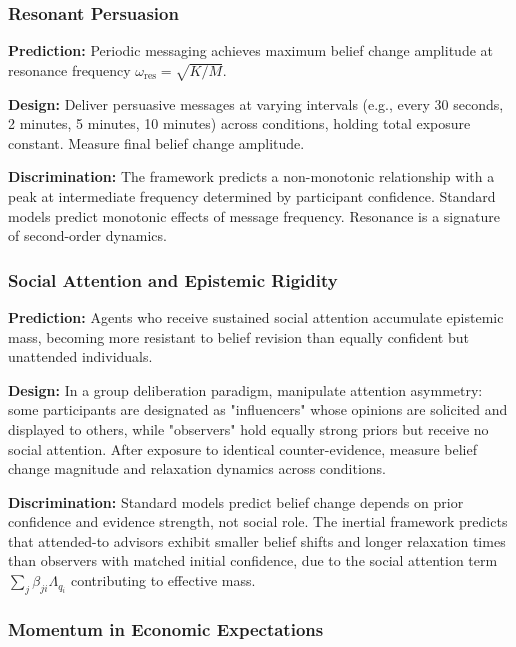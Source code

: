 \documentclass[12pt]{article}
\begin{document}
\subsubsection{Resonant Persuasion}

\textbf{Prediction:} Periodic messaging achieves maximum belief change amplitude at resonance frequency $\omega_{\text{res}} = \sqrt{K/M}$.

\textbf{Design:} Deliver persuasive messages at varying intervals (e.g., every 30 seconds, 2 minutes, 5 minutes, 10 minutes) across conditions, holding total exposure constant. Measure final belief change amplitude.

\textbf{Discrimination:} The framework predicts a non-monotonic relationship with a peak at intermediate frequency determined by participant confidence. Standard models predict monotonic effects of message frequency. Resonance is a signature of second-order dynamics.

\subsubsection{Social Attention and Epistemic Rigidity}

 

\textbf{Prediction:} Agents who receive sustained social attention accumulate epistemic mass, becoming more resistant to belief revision than equally confident but unattended individuals.

 

\textbf{Design:} In a group deliberation paradigm, manipulate attention asymmetry: some participants are designated as "influencers" whose opinions are solicited and displayed to others, while "observers" hold equally strong priors but receive no social attention. After exposure to identical counter-evidence, measure belief change magnitude and relaxation dynamics across conditions.


\textbf{Discrimination:} Standard models predict belief change depends on prior confidence and evidence strength, not social role. The inertial framework predicts that attended-to advisors exhibit smaller belief shifts and longer relaxation times than observers with matched initial confidence, due to the social attention term $\sum_j \beta_{ji} \Lambda_{q_i}$ contributing to effective mass.
 

\subsubsection{Momentum in Economic Expectations}
\end{document}
